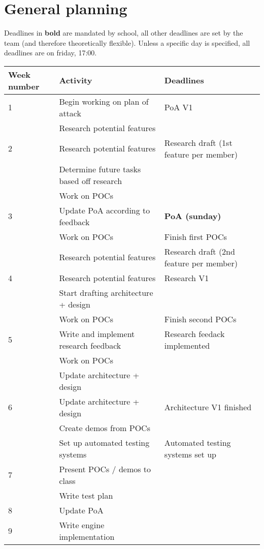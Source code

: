 \documentclass{article} %
\begin{document}
    \section{General planning} %
    Deadlines in \textbf{bold} are mandated by school, all other deadlines are set by the team (and therefore theoretically flexible).
    Unless a specific day is specified, all deadlines are on friday, 17:00.
    \begin{tabularx}{\textwidth}{|l|X|X|}
    \hline
    \textbf{Week number} & \textbf{Activity} & \textbf{Deadlines} \\ \hline
    1 & Begin working on plan of attack & PoA V1 \\ \hline
      & Research potential features & \\ \hline
    2 & Research potential features & Research draft (1st feature per member) \\ \hline
      & Determine future tasks based off research &  \\ \hline
      & Work on POCs & \\ \hline
    3 & Update PoA according to feedback &  \textbf{PoA (sunday)} \\ \hline
      & Work on POCs & Finish first POCs \\ \hline
      & Research potential features & Research draft (2nd feature per member) \\ \hline
    4 & Research potential features & Research V1 \\ \hline
      & Start drafting architecture + design &  \\ \hline
      & Work on POCs & Finish second POCs \\ \hline
    5 & Write and implement research feedback & Research feedack implemented \\ \hline
     & Work on POCs &  \\ \hline
      & Update architecture + design &  \\ \hline
    6 & Update architecture + design & Architecture V1 finished \\ \hline
      & Create demos from POCs & \\ \hline
      & Set up automated testing systems & Automated testing systems set up \\ \hline
    7 & Present POCs / demos to class &  \\ \hline
      & Write test plan & \\ \hline
    8 & Update PoA &  \\ \hline
    9 & Write engine implementation &  \\ \hline

\end{tabularx}
\end{document}
